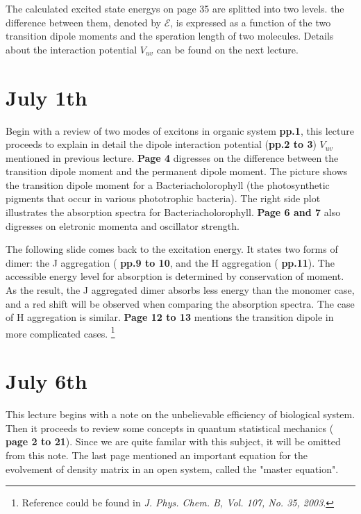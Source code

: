 \documentclass{article}
\numberwithin{equation}{subsection} %
\theoremstyle{definition}
\begin{document}
The calculated excited state energys on page 35 are splitted into
two levels. the difference between them, denoted by $\mathcal{E}$,
is expressed as a function of the two
transition dipole moments and the speration length of two molecules.
Details about the interaction potential $V_{uv}$ can be found on
the next lecture.

\section{July 1th}
\label{sec:July_1th}
Begin with a review of two modes of excitons in organic system
\textbf{pp.1}, this
lecture proceeds to explain in detail the dipole interaction potential
(\textbf{pp.2 to 3})
$V_{uv}$ mentioned in previous lecture. \textbf{Page 4} digresses on
the difference between the transition dipole moment and the
permanent dipole moment. The picture shows the transition dipole
moment for a Bacteriacholorophyll (the photosynthetic pigments that 
occur in various phototrophic bacteria). The right side plot illustrates
the absorption spectra for Bacteriacholorophyll.
\textbf{Page 6 and 7} also digresses on eletronic momenta and oscillator
strength. 

The following slide comes back to the excitation energy. It states two
forms of dimer: the J aggregation ( \textbf{pp.9 to 10}, and the H
aggregation ( \textbf{pp.11}). The accessible energy level for absorption
is determined by conservation of moment. As the result, the J aggregated
dimer absorbs less energy than the monomer case, and a red shift will be
observed when comparing the absorption spectra. The case of H aggregation
is similar. \textbf{Page 12 to 13 } mentions the transition dipole in
more complicated cases. \footnote{Reference could be found in \textit{
J. Phys. Chem. B, Vol. 107, No. 35, 2003}.}

\section{July 6th}
\label{sec:July_6th}
This lecture begins with a note on the unbelievable efficiency of biological
system. Then it proceeds to review some concepts in quantum statistical 
mechanics ( \textbf{page 2 to 21}). Since we are quite familar with this
subject, it will be omitted from this note. The last page mentioned an
important equation for the evolvement of density matrix in an open system,
called the "master equation".
\end{document}
